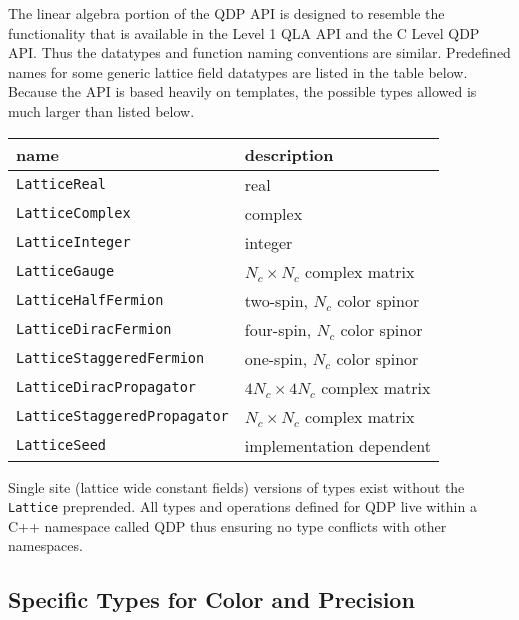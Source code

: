 \documentclass[12pt,letterpaper]{article}
\newcommand{\cpp}{C++}
\newcommand{\tLatticeReal}{LatticeReal}
\newcommand{\tLatticeComplex}{LatticeComplex}
\newcommand{\tLatticeInt}{LatticeInteger}
\newcommand{\tLatticeColorMatrix}{LatticeGauge}
\newcommand{\tLatticeHalfFermion}{LatticeHalfFermion}
\newcommand{\tLatticeDiracFermion}{LatticeDiracFermion}
\newcommand{\tLatticeStaggeredFermion}{LatticeStaggeredFermion}
\newcommand{\tLatticeDiracPropagator}{LatticeDiracPropagator}
\newcommand{\tLatticeStaggeredPropagator}{LatticeStaggeredPropagator}
\newcommand{\tLatticeRandomState}{LatticeSeed}
\begin{document}
The linear algebra portion of the QDP API is designed to resemble the
functionality that is available in the Level 1 QLA API and the C Level
QDP API.  Thus the datatypes and function naming conventions are
similar.  Predefined names for some generic lattice field datatypes
are listed in the table below. Because the API is based heavily on
templates, the possible types allowed is much larger than listed
below.
\begin{center}
\begin{tabular}{|l|l|}
\hline
name                       & description \\
\hline
{\tt \tLatticeReal               } & real \\
{\tt \tLatticeComplex            } & complex \\
{\tt \tLatticeInt                } & integer \\
{\tt \tLatticeColorMatrix              } & $N_c \times N_c$ complex matrix \\
{\tt \tLatticeHalfFermion        } & two-spin, $N_c$ color spinor \\
{\tt \tLatticeDiracFermion       } & four-spin, $N_c$ color spinor \\
{\tt \tLatticeStaggeredFermion   } & one-spin,  $N_c$ color spinor \\
{\tt \tLatticeDiracPropagator    } & $4N_c \times 4N_c$ complex matrix \\
{\tt \tLatticeStaggeredPropagator} & $N_c \times N_c$ complex matrix \\
{\tt \tLatticeRandomState        } & implementation dependent \\
\hline
\end{tabular}
\end{center}
%
Single site (lattice wide constant fields) versions of types exist
without the {\tt Lattice} preprended.  All types and operations
defined for QDP live within a \cpp{} namespace called QDP thus
ensuring no type conflicts with other namespaces.

\subsection{Specific Types for Color and Precision}
\end{document}
